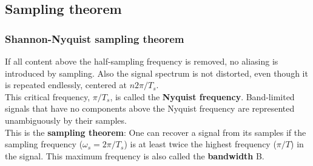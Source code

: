 \subsection{Sampling theorem}

\begin{frame}
	\frametitle{Shannon-Nyquist sampling theorem}
	\begin{block}{}
	If all content above the half-sampling frequency is removed, no aliasing is introduced by sampling. Also the signal spectrum is not distorted, even though it is repeated endlessly, centered at $n2\pi/T_s$.\\
	\medskip
	This critical frequency, $\pi/T_s$, is called the \textbf{Nyquist frequency}. Band-limited signals that have no components above the Nyquist frequency are represented unambiguously by their samples. \\
	\medskip
	This is the \textbf{sampling theorem}: One can recover a signal from its samples if the sampling frequency ($\omega_s=2\pi/T_s$) is at least twice the highest frequency ($\pi/T$) in the signal. This maximum frequency is also called the \textbf{bandwidth} B.
	\end{block}
\end{frame}

